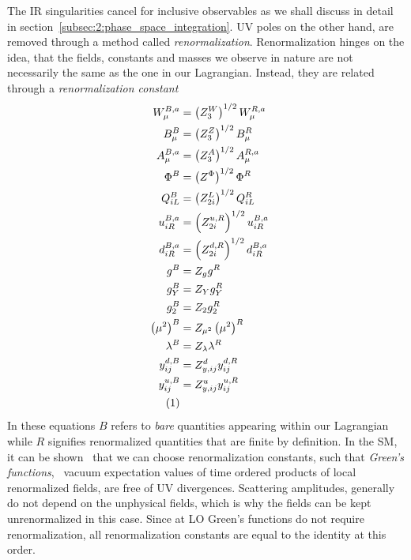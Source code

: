 The \acs{IR} singularities cancel for inclusive observables as we shall discuss in detail in section~\ref{subsec:2:phase_space_integration}. \acs{UV} poles on the other hand, are removed through a method called \textit{renormalization}. Renormalization hinges on the idea, that the fields, constants and masses we observe in nature are not necessarily the same as the one in our Lagrangian. Instead, they are related through a \textit{renormalization constant}
\begin{align*}
W_\mu^{B,a} &= \left(Z_3^W \right)^{1/2} W_\mu^{R,a} \\
B_\mu^{B} &= \left(Z_3^Z \right)^{1/2} B_\mu^{R} \\
A_\mu^{B,a} &= \left(Z_3^A \right)^{1/2} A_\mu^{R,a} \\
\Phi^{B} &= \left(Z^\Phi \right)^{1/2} \Phi^{R} \\
Q_{iL}^{B} &= \left(Z_{2i}^L \right)^{1/2} Q_{iL}^{R} \\
u_{iR}^{B,a} &= \left(Z_{2i}^{u,R} \right)^{1/2} u_{iR}^{B,a} \\
d_{iR}^{B,a} &= \left(Z_{2i}^{d,R} \right)^{1/2} d_{iR}^{B,a} \\
g^B &= Z_g g^R \\
g_Y^B &= Z_Y g_Y^R \\
g_2^B &= Z_2 g_2^R \\
\left(\mu^2 \right)^B &= Z_{\mu^2} \left( \mu^2 \right)^R \\
\lambda^B &= Z_\lambda \lambda^R \\
y_{ij}^{d,B} &= Z_{y,ij}^{d} y_{ij}^{d,R} \\
y_{ij}^{u,B} &= Z_{y,ij}^{u} y_{ij}^{u,R} \\
\refstepcounter{equation}
\tag{\theequation} \label{eq:2:renormalization}
\end{align*}
In these equations $B$ refers to \textit{bare} quantities appearing within our Lagrangian while $R$ signifies renormalized quantities that are finite by definition. In the \acs{SM}, it can be shown~\cite{tHooft:1971qjg,tHooft:1972tcz} that we can choose renormalization constants, such that \textit{Green's functions}, \ie\ vacuum expectation values of time ordered products of local renormalized fields, are free of \acs{UV} divergences. Scattering amplitudes, generally do not depend on the unphysical fields, which is why the fields can be kept unrenormalized in this case. Since at \acs{LO} Green's functions do not require renormalization, all renormalization constants are equal to the identity at this order.

